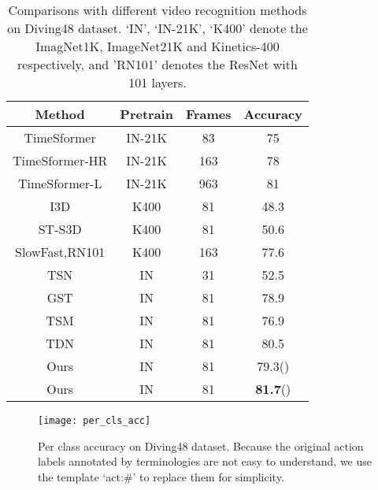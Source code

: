 \documentclass[journal]{IEEEtran}
\begin{document}
\begin{table}[ht]
    \centering
	\caption{Comparisons with different video recognition methods on Diving48 dataset. `IN', `IN-21K', `K400' denote the ImagNet1K, ImageNet21K and Kinetics-400 respectively, and 'RN101' denotes the ResNet with 101 layers.}
	\label{tab:diving48}
    \begin{tabular}{cccc} \hline
        Method              & Pretrain  & Frames & Accuracy  \\ \hline
        TimeSformer \cite{bertasius2021space}         & IN-21K    & 83    & 75        \\ 
        TimeSformer-HR \cite{bertasius2021space}      & IN-21K    & 163  & 78        \\ 
        TimeSformer-L \cite{bertasius2021space}       & IN-21K    & 963   & 81        \\ 
        I3D  \cite{carreira2017quo} & K400      & 81    & 48.3      \\
        ST-S3D  \cite{xie2018rethinking} & K400      & 81    & 50.6      \\
        SlowFast,RN101 \cite{feichtenhofer2019slowfast}& K400      & 163   & 77.6      \\
        TSN \cite{wang2016temporal} & IN        & 31      & 52.5      \\
        GST \cite{luo2019grouped}              & IN        & 81    & 78.9      \\
        TSM \cite{lin2019tsm} & IN        & 81    & 76.9      \\
        TDN \cite{wang2021tdn} & IN        & 81    & 80.5      \\ \hline
        Ours          & IN        & 81    & 79.3() \\
        Ours        & IN        & 81    & \textbf{81.7}() \\ \hline
    \end{tabular}
\end{table}

\begin{figure*}
    \centering
    \texttt{[image: per\_cls\_acc]}
    \caption{Per class accuracy on Diving48 dataset.
    Because the original action labels annotated by terminologies are not easy to understand, we use the template `act:\#' to replace them for simplicity.}
    \label{fig:per_cls_acc}
\end{figure*}
\end{document}
